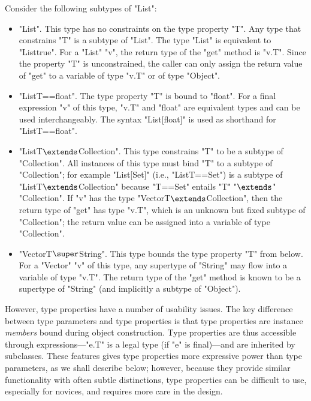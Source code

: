 Consider the following subtypes of \xcd"List":
\begin{itemize}
\item \xcd"List".  This type has no constraints on the type
property \xcd"T".
Any type that constrains \xcd"T"
is a subtype of \xcd"List".  The type \xcd"List" is equivalent to
\xcd"List{true}".
%
For a \xcd"List" \xcd"v", the return type of the \xcd"get" method
is \xcd"v.T".
Since the property \xcd"T" is unconstrained,
the caller can only assign the return value of \xcd"get"
to a variable of type \xcd"v.T" or of type \xcd"Object".

\item \xcd"List{T==float}".
The type property \xcd"T" is bound to \xcd"float".
For a final expression \xcd"v" of this type,
\xcd"v.T" and \xcd"float" are equivalent types and can be used
interchangeably.
The syntax \xcd"List[float]" is used as
shorthand for \xcd"List{T==float}".

\item \xcdmath"List{T$\extends$Collection}".
This type constrains \xcd"T" to be a subtype of \xcd"Collection".
All instances of this type must bind \xcd"T" to a subtype of
\xcd"Collection"; for example \xcd"List[Set]" (i.e.,
\xcd"List{T==Set}") is a subtype of
\xcdmath"List{T$\extends$Collection}" because \xcd"T==Set" entails
\xcdmath"T"
\xcdmath"$\extends$"
\xcdmath"Collection".
%
If \xcd"v" has the type \xcdmath"Vector{T$\extends$Collection}",
then the return type of \xcd"get" has type \xcd"v.T", which is an unknown but
fixed subtype of \xcd"Collection"; the return value can be
assigned into a variable of type \xcd"Collection".

\item \xcdmath"Vector{T$\super$String}".  This type bounds the type property
\xcd"T"
from below.  For a \xcd"Vector" \xcd"v" of this type, any
supertype of \xcd"String" may flow into a variable of type \xcd"v.T".
The return type of the \xcd"get"
method is known to be a
supertype of \xcd"String" (and implicitly a subtype of \xcd"Object").
\end{itemize}


However,
type properties have a number of usability issues.
The key difference between type parameters and type properties
is that type properties are
instance \emph{members} bound during object construction.  Type
properties are thus accessible through expressions---\xcd"e.T" is
a legal type (if \xcd"e" is final)---and are inherited by subclasses.
These features gives type properties more expressive power than
type parameters, as we shall describe below; however, because they 
provide similar functionality with often subtle distinctions,
type properties can be difficult to use, especially for novices,
and requires more care in the design.

